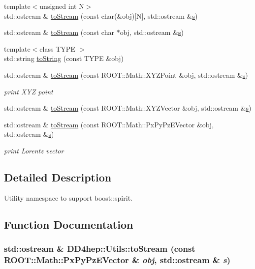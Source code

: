 \begin{DoxyCompactItemize}
\item 
{\footnotesize template$<$unsigned int N$>$ }\\std::ostream \& \hyperlink{namespace_d_d4hep_1_1_utils_aad9c223ff08f471324e0257468289c01}{toStream} (const char(\&obj)\mbox{[}N\mbox{]}, std::ostream \&\hyperlink{_volumes_8cpp_a17ca6bfc8040d695d3cada22a4763d40}{s})
\item 
std::ostream \& \hyperlink{namespace_d_d4hep_1_1_utils_a0e52adf037edd29df048973406fc2554}{toStream} (const char $\ast$obj, std::ostream \&\hyperlink{_volumes_8cpp_a17ca6bfc8040d695d3cada22a4763d40}{s})
\item 
{\footnotesize template$<$class TYPE $>$ }\\std::string \hyperlink{namespace_d_d4hep_1_1_utils_a30628e1cc5d4a214cc8a33f99b38d466}{toString} (const TYPE \&obj)
\item 
std::ostream \& \hyperlink{namespace_d_d4hep_1_1_utils_a2a135f6ca6327240ccb6a2f796c6fc49}{toStream} (const ROOT::Math::XYZPoint \&obj, std::ostream \&\hyperlink{_volumes_8cpp_a17ca6bfc8040d695d3cada22a4763d40}{s})
\begin{DoxyCompactList}\small\item\em print XYZ point \item\end{DoxyCompactList}\item 
std::ostream \& \hyperlink{namespace_d_d4hep_1_1_utils_ad01ecddf10c1ce2ef7593b0a01516898}{toStream} (const ROOT::Math::XYZVector \&obj, std::ostream \&\hyperlink{_volumes_8cpp_a17ca6bfc8040d695d3cada22a4763d40}{s})
\item 
std::ostream \& \hyperlink{namespace_d_d4hep_1_1_utils_aba37b7ad17a5c6c9f0db489d583ce2bc}{toStream} (const ROOT::Math::PxPyPzEVector \&obj, std::ostream \&\hyperlink{_volumes_8cpp_a17ca6bfc8040d695d3cada22a4763d40}{s})
\begin{DoxyCompactList}\small\item\em print Lorentz vector \item\end{DoxyCompactList}\end{DoxyCompactItemize}


\subsection{Detailed Description}
Utility namespace to support boost::spirit. 

\subsection{Function Documentation}
\hypertarget{namespace_d_d4hep_1_1_utils_aba37b7ad17a5c6c9f0db489d583ce2bc}{
\subsubsection[{toStream}]{\setlength{\rightskip}{0pt plus 5cm}std::ostream \& DD4hep::Utils::toStream (const ROOT::Math::PxPyPzEVector \& {\em obj}, \/  std::ostream \& {\em s})}}
\label{namespace_d_d4hep_1_1_utils_aba37b7ad17a5c6c9f0db489d583ce2bc}


